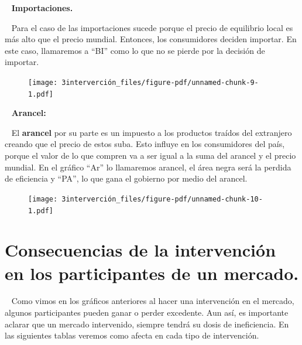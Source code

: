\documentclass[
  letterpaper,
  DIV=11,
  numbers=noendperiod]{scrreport}
\begin{document}
~ \textbf{Importaciones.}

~ Para el caso de las importaciones sucede porque el precio de
equilibrio local es más alto que el precio mundial. Entonces, los
consumidores deciden importar. En este caso, llamaremos a ``BI'' como lo
que no se pierde por la decisión de importar.

\begin{figure}

{\centering \texttt{[image: 3interverción\_files/figure-pdf/unnamed-chunk-9-1.pdf]}

}

\end{figure}

~ \textbf{Arancel:}

~ El \textbf{arancel} por su parte es un impuesto a los productos
traídos del extranjero creando que el precio de estos suba. Esto influye
en los consumidores del país, porque el valor de lo que compren va a ser
igual a la suma del arancel y el precio mundial. En el gráfico ``Ar'' lo
llamaremos arancel, el área negra será la perdida de eficiencia y
``PA'', lo que gana el gobierno por medio del arancel.

\newpage

\begin{figure}

{\centering \texttt{[image: 3interverción\_files/figure-pdf/unnamed-chunk-10-1.pdf]}

}

\end{figure}

\hypertarget{consecuencias-de-la-intervenciuxf3n-en-los-participantes-de-un-mercado.}{%
\section{Consecuencias de la intervención en los participantes de un
mercado.}\label{consecuencias-de-la-intervenciuxf3n-en-los-participantes-de-un-mercado.}}

~ Como vimos en los gráficos anteriores al hacer una intervención en el
mercado, algunos participantes pueden ganar o perder excedente. Aun así,
es importante aclarar que un mercado intervenido, siempre tendrá su
dosis de ineficiencia. En las siguientes tablas veremos como afecta en
cada tipo de intervención.
\end{document}
